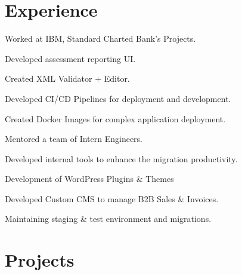 \documentclass[]{standardcv}
\begin{document}
\begin{minipage}[t]{0.70\textwidth} 



\section{Experience}
\vspace{\topsep} %
\begin{tightemize}
\sectionsep
\item Worked at IBM, Standard Charted Bank’s Projects.
\item Developed assessment reporting UI. 
\item Created XML Validator + Editor.  
\end{tightemize}
\sectionsep

\begin{tightemize}
\sectionsep
\item Developed CI/CD Pipelines for deployment and development.
\item Created Docker Images for complex application deployment.
\item Mentored a team of Intern Engineers.
\item Developed internal tools to enhance the migration productivity.
\end{tightemize}
\sectionsep

\begin{tightemize}
\sectionsep
\item Development of WordPress Plugins \& Themes
\item Developed Custom CMS to manage B2B Sales \& Invoices.
\item Maintaining staging \& test environment and migrations.
\end{tightemize}
\sectionsep



\section{Projects}


\end{minipage}
\end{document}
